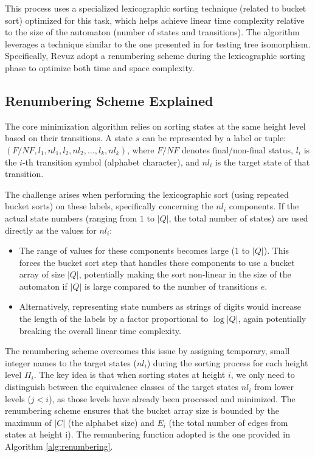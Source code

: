 This process uses a specialized lexicographic sorting technique (related to bucket sort) optimized for this task, which helps achieve linear time complexity relative to the size of the automaton (number of states and transitions). The algorithm leverages a technique similar to the one presented in \cite{aho1974design} for testing tree isomorphism. Specifically, Revuz adopt a renumbering scheme during the lexicographic sorting phase to optimize both time and space complexity. 

\subsection{Renumbering Scheme Explained}
The core minimization algorithm relies on sorting states at the same height level based on their transitions. A state $s$ can be represented by a label or tuple: $(F/NF, l_1, nl_1, l_2, nl_2, \dots, l_k, nl_k)$, where $F/NF$ denotes final/non-final status, $l_i$ is the $i$-th transition symbol (alphabet character), and $nl_i$ is the target state of that transition.

The challenge arises when performing the lexicographic sort (using repeated bucket sorts) on these labels, specifically concerning the $nl_i$ components. If the actual state numbers (ranging from $1$ to $|Q|$, the total number of states) are used directly as the values for $nl_i$:
\begin{itemize}
    \item The range of values for these components becomes large ($1$ to $|Q|$). This forces the bucket sort step that handles these components to use a bucket array of size $|Q|$, potentially making the sort non-linear in the size of the automaton if $|Q|$ is large compared to the number of transitions $e$.
    \item Alternatively, representing state numbers as strings of digits would increase the length of the labels by a factor proportional to $\log |Q|$, again potentially breaking the overall linear time complexity.
\end{itemize}

The renumbering scheme overcomes this issue by assigning temporary, small integer names to the target states ($nl_i$) during the sorting process for each height level $\Pi_i$. The key idea is that when sorting states at height $i$, we only need to distinguish between the equivalence classes of the target states $nl_i$ from lower levels ($j < i$), as those levels have already been processed and minimized. The renumbering scheme ensures that the bucket array size is bounded by the maximum of $|C|$ (the alphabet size) and $E_i$ (the total number of edges from states at height i). The renumbering function adopted is the one provided in Algorithm \ref{alg:renumbering}.

